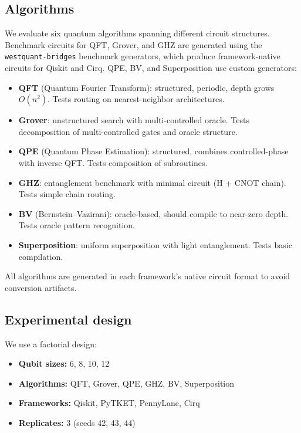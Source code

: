 \documentclass[11pt,a4paper]{article}
\begin{document}
\subsection{Algorithms}

We evaluate six quantum algorithms spanning different circuit structures. Benchmark circuits for QFT, Grover, and GHZ are generated using the \texttt{westquant-bridges} benchmark generators, which produce framework-native circuits for Qiskit and Cirq. QPE, BV, and Superposition use custom generators:

\begin{itemize}[noitemsep]
\item \textbf{QFT} (Quantum Fourier Transform): structured, periodic, depth grows $O(n^2)$. Tests routing on nearest-neighbor architectures.
\item \textbf{Grover}: unstructured search with multi-controlled oracle. Tests decomposition of multi-controlled gates and oracle structure.
\item \textbf{QPE} (Quantum Phase Estimation): structured, combines controlled-phase with inverse QFT. Tests composition of subroutines.
\item \textbf{GHZ}: entanglement benchmark with minimal circuit (H + CNOT chain). Tests simple chain routing.
\item \textbf{BV} (Bernstein--Vazirani): oracle-based, should compile to near-zero depth. Tests oracle pattern recognition.
\item \textbf{Superposition}: uniform superposition with light entanglement. Tests basic compilation.
\end{itemize}

All algorithms are generated in each framework's native circuit format to avoid conversion artifacts.

\subsection{Experimental design}

We use a factorial design:

\begin{itemize}[noitemsep]
\item \textbf{Qubit sizes:} 6, 8, 10, 12
\item \textbf{Algorithms:} QFT, Grover, QPE, GHZ, BV, Superposition
\item \textbf{Frameworks:} Qiskit, PyTKET, PennyLane, Cirq
\item \textbf{Replicates:} 3 (seeds 42, 43, 44)
\end{itemize}
\end{document}
